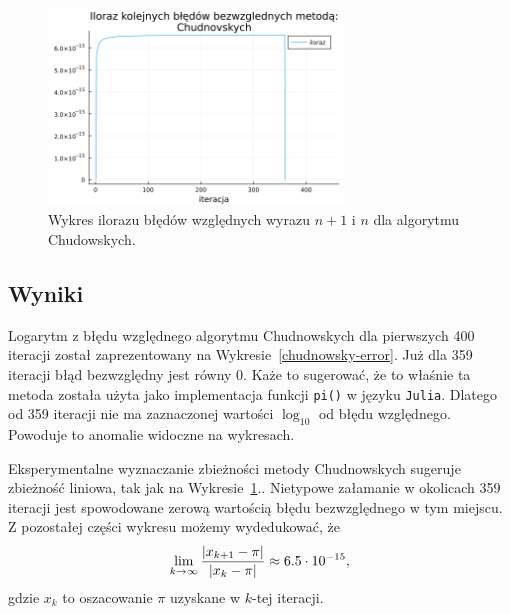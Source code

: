 \begin{figure}[!h]
    \centering
    \renewcommand{\figurename}{Wykres}
    \includegraphics[width=0.7\textwidth]{../prog/chudnowsky_error_ratio.png}
    \caption{Wykres ilorazu błędów względnych wyrazu $n+1$ i $n$ dla algorytmu Chudowskych.}
    \label{chudnowsky-convergence}
\end{figure}

\subsection{Wyniki}

Logarytm z błędu względnego algorytmu Chudnowskych dla pierwszych 400 iteracji został zaprezentowany na Wykresie~\ref{chudnowsky-error}. Już dla 359 iteracji błąd bezwzględny jest równy 0. Każe to sugerować, że to właśnie ta metoda została użyta jako implementacja funkcji \verb+pi()+ w języku \verb+Julia+. Dlatego od 359 iteracji nie ma zaznaczonej wartości $\log_{10}$ od błędu względnego. Powoduje to anomalie widoczne na wykresach.

Eksperymentalne wyznaczanie zbieżności metody Chudnowskych sugeruje zbieżność liniowa, tak jak na Wykresie~\ref{chudnowsky-convergence}.. Nietypowe załamanie w okolicach 359 iteracji jest spowodowane zerową wartością błędu bezwzględnego w tym miejscu. Z pozostałej części wykresu możemy wydedukować, że
$$\lim_{k\to\infty}{{|x_{k+1}-\pi|\over |x_k-\pi|}}\approx 6.5\cdot 10^{-15},$$
gdzie $x_k$ to oszacowanie $\pi$ uzyskane w $k$-tej iteracji.